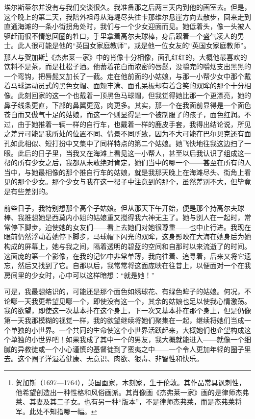 \par 埃尔斯蒂尔并没有与我们交谈很久。我准备那之后两三天内到他的画室去。但是，这个晚上的第二天，我陪外祖母从海堤尽头往卡那维尔悬崖方向去散步，回来走到直通海滩的一条小街拐角处时，我们与一个少女迎面而见。她低着头，像一头被人驱赶而很不情愿回圈的牲口，手里拿着高尔夫球棒，身后跟着一个盛气凌人的男士。此人很可能是他的“英国女家庭教师”，或是他一位女友的“英国女家庭教师”。那人与贺加斯\footnote{贺加斯（1697—1764），英国画家，木刻家，生于伦敦。其作品常具讽刺性，他希望创造出一种性格和风俗画派。其肖像画《杰弗莱一家》画的是律师杰弗莱、其妻及其二子女。也有另一种“版本”，不是律师杰弗莱，而是杰弗莱将军。此处不知指哪一幅。}《杰弗莱一家》中的肖像十分相像，面孔红红的，大概他最喜欢的饮料不是茶，而是杜松子酒。他蓄着花白而浓密的唇髭，没嚼完的嚼烟支出黑黑的一个弯钩，把唇髭又加长了一截。走在他前面的小姑娘，与那一小帮少女中那个戴着马球运动员式的黑色女帽、面颊丰满、面孔呆板却有着含笑的双眸的那个十分相像。此刻回家的这一个也戴着一顶黑色马球帽，但我觉得她比那一个更漂亮，她的鼻子线条更直，下部的鼻翼更宽，肉更多。其实，那一个在我面前显得是一个面色苍白而又傲气十足的姑娘，而这一个则显得是一个被制服了的孩子，面色红润。不过，由于她推着一辆一样的自行车，也戴着一样的鹿皮手套，我得出结论说，所见之差异可能是我所处的位置不同、情景不同所致，因为不大可能在巴尔贝克还有面孔如此相似、短打扮中又集中了同样特点的第二个姑娘。她飞快地往我这边扫了一眼。此后的日子里，当我又在海滩上看见这一小帮人，甚至以后我认识了组成这一帮的所有少女之后，我都从未敢绝对肯定，她们当中的哪一个——甚至在所有的人当中，与她最相像的那个推自行车的姑娘，就是我那天晚上在海滩尽头、街角上看见的那个少女。那个少女与我在这一帮子中注意到的那个，虽然差别不大，但毕竟是有些差别的。
\par 前些日子，我特别想那个高个子姑娘。但从那天下午开始，便是那个持高尔夫球棒、我推想她是西莫内小姐的姑娘重又搅得我六神无主了。她与别人在一起时，常常停下脚步，迫使她的女友们——看上去她们对她很尊重——也中止行进。我现在眼前仍然浮动着她停下脚步，马球帽下闪光的双眸，这身影映在大海在她身后为她构成的屏幕上，她与我之间，隔着透明的碧蓝的空间和自那时以来流逝了的时间。这面庞的第一个影像，在我的记忆中非常单薄，我向往着、追寻着，后来又将它遗忘，然后又找到了它。自那以后，我常常将这面庞映在往昔上，以便面对一个在我房间里的少女时，心中可以这样暗想：“就是她！”
\par 可是，我最想结识的，可能还是那个面色如绣球花、有绿色眸子的姑娘。何况，不论哪一天我更希望见哪一个，即使没有这一个，其余的姑娘也足以使我心情激荡。我的欲望，即使这一次基本扑在这个身上，下一次又基本扑在那个身上，但是仍像第一天我那模糊的视觉一样，我的欲望继续将她们聚集在一起，继续将她们当成一个单独的小世界。一个共同的生命使这个小世界活跃起来，大概她们也企望构成这个单独的小世界吧！如果我成了其中一个的男友，我大概就能进入——就像一个细腻的异教徒或一个小心谨慎的基督徒到了蛮夷之中——一个令人更加年轻的圈子里去。这个圈子洋溢着健康、无意识、肉欲、狠毒、非智性和快乐。
